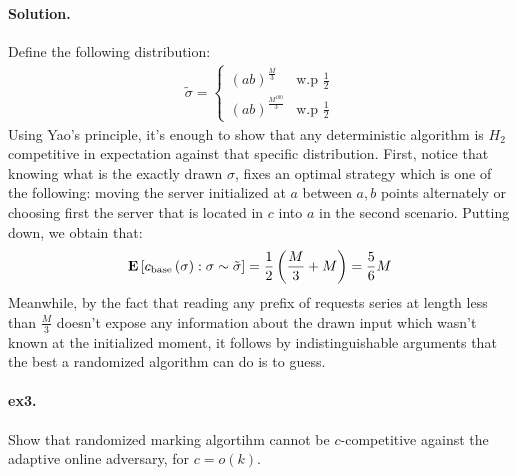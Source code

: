 \documentclass{article}
\begin{document}
\begin{multicols*}{2}
  \paragraph{Solution.} Define the following distribution: 
  \begin{equation*}
    \begin{split}
      \tilde{\sigma} = \begin{cases}
	(ab)^{\frac{M}{3}} & \text{w.p  } \frac{1}{2} \\ 
	(ab)^{\frac{M^{100}}{3}} &  \text{w.p  } \frac{1}{2}  
      \end{cases}
    \end{split}
  \end{equation*}
  Using Yao's principle, it's enough to show that any deterministic algorithm is $H_{2}$ competitive in expectation against that specific distribution. First, notice that knowing what is the exactly drawn $\sigma$, fixes an optimal strategy which is one of the following: moving the server initialized at $a$ between $a,b$ points alternately or choosing first the server that is located in $c$ into $a$ in the second scenario.
  Putting down, we obtain that: 
  \begin{equation*}
    \begin{split}
      \mathbf{E} \left[ { c_{\text{base}} \left( \sigma \right)   : \sigma \sim \tilde{\sigma}} \right] = \frac{1}{2} \left(  \frac{M}{3} + M  \right) = \frac{5}{6}M 
    \end{split}
  \end{equation*}
  Meanwhile, by the fact that reading any prefix of requests series at length less than $\frac{M}{3}$ doesn't expose any information about the drawn input which wasn't known at the initialized moment, it follows by indistinguishable arguments that the best a randomized algorithm can do is to guess.     
  \paragraph{ex3.} Show that randomized marking algortihm cannot be $c$-competitive against the adaptive online adversary, for $c=o\left( k \right)$. 

\end{multicols*}
\end{document}
